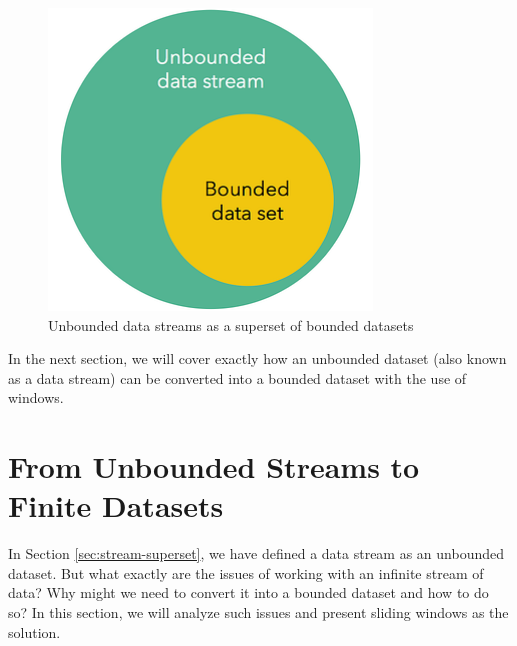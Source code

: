 \begin{figure}[!htb]
    \begin{center}
      \includegraphics[scale=0.5]{figures/unbounded-superset-bounded.png}
      \caption[Unbounded data streams as a superset of bounded datasets]{Unbounded data streams as a superset of bounded datasets \cite{batch-is-a-special-case-of-streaming}}
      \label{fig:unbounded-bounded-superset}
    \end{center}
\end{figure}


In the next section, we will cover exactly how an unbounded dataset (also known as a data stream) can be converted into a bounded dataset with the use of windows.

\section{From Unbounded Streams to Finite Datasets} \label{sec:windows}

In Section \ref{sec:stream-superset}, we have defined a data stream as an unbounded dataset. But what exactly are the issues of working with an infinite stream of data? Why might we need to convert it into a bounded dataset and how to do so? In this section, we will analyze such issues and present sliding windows as the solution.

